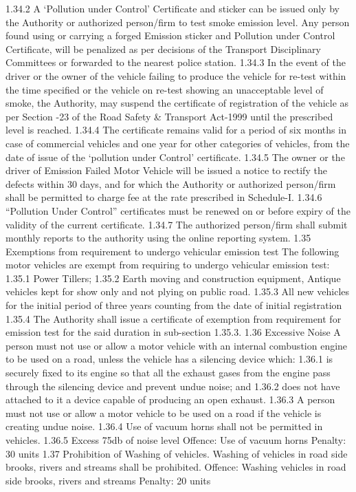 \documentclass[
]{book}
\begin{document}
1.34.2 A `Pollution under Control' Certificate and sticker can be issued only by the Authority or authorized person/firm to test smoke emission level. Any person found using or carrying a forged Emission sticker and Pollution under Control Certificate, will be penalized as per decisions of the Transport Disciplinary Committees or forwarded to the nearest police station.
1.34.3 In the event of the driver or the owner of the vehicle failing to produce the vehicle for re-test within the time specified or the vehicle on re-test showing an unacceptable level of smoke, the Authority, may suspend the certificate of registration of the vehicle as per Section -23 of the Road Safety \& Transport Act-1999 until the prescribed level is reached.
1.34.4 The certificate remains valid for a period of six months in case of commercial vehicles and one year for other categories of vehicles, from the date of issue of the `pollution under Control' certificate.
1.34.5 The owner or the driver of Emission Failed Motor Vehicle will be issued a notice to rectify the defects within 30 days, and for which the Authority or authorized person/firm shall be permitted to charge fee at the rate prescribed in Schedule-I.
1.34.6 ``Pollution Under Control'' certificates must be renewed on or before expiry of the validity of the current certificate.
1.34.7 The authorized person/firm shall submit monthly reports to the authority using the online reporting system.
1.35 Exemptions from requirement to undergo vehicular emission test
The following motor vehicles are exempt from requiring to undergo vehicular emission test:
1.35.1 Power Tillers;
1.35.2 Earth moving and construction equipment, Antique vehicles kept for show only and not plying on public road.
1.35.3 All new vehicles for the initial period of three years counting from the date of initial registration
1.35.4 The Authority shall issue a certificate of exemption from requirement for emission test for the said duration in sub-section 1.35.3.
1.36 Excessive Noise
A person must not use or allow a motor vehicle with an internal combustion engine to be used on a road, unless the vehicle has a silencing device which:
1.36.1 is securely fixed to its engine so that all the exhaust gases from the engine pass through the silencing device and prevent undue noise; and
1.36.2 does not have attached to it a device capable of producing an open exhaust.
1.36.3 A person must not use or allow a motor vehicle to be used on a road if the vehicle is creating undue noise.
1.36.4 Use of vacuum horns shall not be permitted in vehicles.
1.36.5 Excess 75db of noise level
Offence: Use of vacuum horns
Penalty: 30 units
1.37 Prohibition of Washing of vehicles.
Washing of vehicles in road side brooks, rivers and streams shall be prohibited.
Offence: Washing vehicles in road side brooks, rivers and streams
Penalty: 20 units
\end{document}
